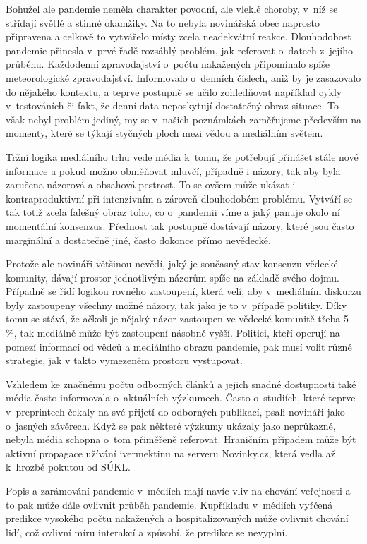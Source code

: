 Bohužel ale pandemie neměla charakter povodní, ale vleklé choroby, v~níž se střídají světlé a stinné okamžiky. Na to nebyla novinářská obec naprosto připravena a celkově to vytvářelo místy zcela neadekvátní reakce. Dlouhodobost pandemie přinesla v~prvé řadě rozsáhlý problém, jak referovat o~datech z~jejího průběhu. Každodenní zpravodajství o~počtu nakažených připomínalo spíše meteorologické zpravodajství. Informovalo o~denních číslech, aniž by je zasazovalo do nějakého kontextu, a teprve postupně se učilo zohledňovat například cykly v~testováních či fakt, že denní data neposkytují dostatečný obraz situace. To však nebyl problém jediný, my se v~našich poznámkách zaměřujeme především na momenty, které se týkají styčných ploch mezi vědou a mediálním světem.

Tržní logika mediálního trhu vede média k~tomu, že potřebují přinášet stále nové informace a pokud možno obměňovat mluvčí, případně i názory, tak aby byla zaručena názorová a obsahová pestrost. To se ovšem může ukázat i kontraproduktivní při intenzivním a zároveň dlouhodobém problému. Vytváří se tak totiž zcela falešný obraz toho, co o~pandemii víme a jaký panuje okolo ní momentální konsenzus. Přednost tak postupně dostávají názory, které jsou často marginální a dostatečně jiné, často dokonce přímo nevědecké.

Protože ale novináři většinou nevědí, jaký je současný stav konsenzu vědecké komunity, dávají prostor jednotlivým názorům spíše na základě svého dojmu. Případně se řídí logikou rovného zastoupení, která velí, aby v~mediálním diskurzu byly zastoupeny všechny možné názory, tak jako je to v~případě politiky. Díky tomu se stává, že ačkoli je nějaký názor zastoupen ve vědecké komunitě třeba 5 \%, tak mediálně může být zastoupení násobně vyšší. Politici, kteří operují na pomezí informací od vědců a mediálního obrazu pandemie, pak musí volit různé strategie, jak v takto vymezeném prostoru vystupovat.

Vzhledem ke značnému počtu odborných článků a jejich snadné dostupnosti také média často informovala o~aktuálních výzkumech. Často o~studiích, které teprve v~preprintech čekaly na své přijetí do odborných publikací, psali novináři jako o~jasných závěrech. Když se pak některé výzkumy ukázaly jako neprůkazné, nebyla média schopna o~tom přiměřeně referovat. Hraničním případem může být aktivní propagace užívání ivermektinu na serveru Novinky.cz, která vedla až k~hrozbě pokutou od SÚKL.

Popis a zarámování pandemie v~médiích mají navíc vliv na chování veřejnosti a to pak může dále ovlivnit průběh pandemie. Kupříkladu v~médiích vyřčená predikce vysokého počtu nakažených a hospitalizovaných může ovlivnit chování lidí, což ovlivní míru interakcí a způsobí, že predikce se nevyplní.

